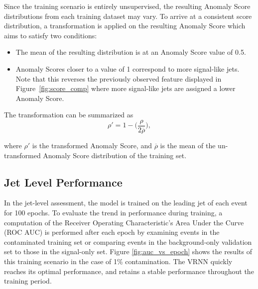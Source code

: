 \documentclass[12pt, a4paper]{article}
\begin{document}
Since the training scenario is entirely unsupervised, the resulting Anomaly Score distributions from each training dataset may vary. To arrive at a consistent score distribution, a transformation is applied on the resulting Anomaly Score which aims to satisfy two conditions:
\begin{itemize}
	\item{The mean of the resulting distribution is at an Anomaly Score value of 0.5.}
	\item{Anomaly Scores closer to a value of 1 correspond to more signal-like jets. Note that this reverses the previously observed feature displayed in Figure~\ref{fig:score_comp} where more signal-like jets are assigned a lower Anomaly Score.}
\end{itemize}

The transformation can be summarized as
\begin{equation}
\label{eq:transformation}
	\rho ' = 1 - \bigg(\frac{\rho}{2\overline{\rho}}\bigg),
\end{equation}

where $\rho '$ is the transformed Anomaly Score, and  $\overline{\rho}$ is the mean of the un-transformed Anomaly Score distribution of the training set.


\subsection{Jet Level Performance}


In the jet-level assessment, the model is trained on the leading jet of each event for 100 epochs. To evaluate the trend in performance during training, a computation of the Receiver Operating Characteristic's Area Under the Curve (ROC AUC) is performed after each epoch by examining events in the contaminated training set or comparing events in the background-only validation set to those in the signal-only set. Figure \ref{fig:auc_vs_epoch} shows the results of this training scenario in the case of 1\% contamination. The VRNN quickly reaches its optimal performance, and retains a stable performance throughout the training period. 
\end{document}

